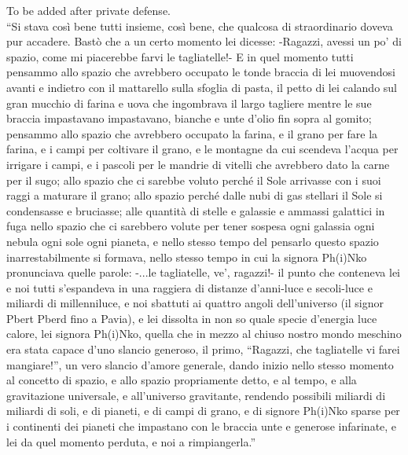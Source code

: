 
\begin{acknowledgements}
\addchaptertocentry{\acknowledgementname} %

To be added after private defense.\\

\textsf{``Si stava così bene tutti insieme, così bene, che qualcosa di straordinario doveva pur accadere.
Bastò che a un certo momento lei dicesse: -Ragazzi, avessi un po’ di spazio, come mi piacerebbe
farvi le tagliatelle!- E in quel momento tutti pensammo allo spazio che avrebbero occupato le
tonde braccia di lei muovendosi avanti e indietro con il mattarello sulla sfoglia di pasta, il petto
di lei calando sul gran mucchio di farina e uova che ingombrava il largo tagliere mentre le sue
braccia impastavano impastavano, bianche e unte d’olio fin sopra al gomito; pensammo allo
spazio che avrebbero occupato la farina, e il grano per fare la farina, e i campi per coltivare il
grano, e le montagne da cui scendeva l’acqua per irrigare i campi, e i pascoli per le mandrie di
vitelli che avrebbero dato la carne per il sugo; allo spazio che ci sarebbe voluto perché il Sole
arrivasse con i suoi raggi a maturare il grano; allo spazio perché dalle nubi di gas stellari il Sole si
condensasse e bruciasse; alle quantità di stelle e galassie e ammassi galattici in fuga nello spazio
che ci sarebbero volute per tener sospesa ogni galassia ogni nebula ogni sole ogni pianeta, e nello
stesso tempo del pensarlo questo spazio inarrestabilmente si formava, nello stesso tempo in cui la
signora Ph(i)Nko pronunciava quelle parole: -...le tagliatelle, ve’, ragazzi!- il punto che conteneva
lei e noi tutti s’espandeva in una raggiera di distanze d’anni-luce e secoli-luce e miliardi di millenniluce,
e noi sbattuti ai quattro angoli dell’universo (il signor Pbert Pberd fino a Pavia), e lei dissolta
in non so quale specie d’energia luce calore, lei signora Ph(i)Nko, quella che in mezzo al chiuso
nostro mondo meschino era stata capace d’uno slancio generoso, il primo, “Ragazzi, che tagliatelle
vi farei mangiare!”, un vero slancio d’amore generale, dando inizio nello stesso momento al
concetto di spazio, e allo spazio propriamente detto, e al tempo, e alla gravitazione universale, e
all’universo gravitante, rendendo possibili miliardi di miliardi di soli, e di pianeti, e di campi di
grano, e di signore Ph(i)Nko sparse per i continenti dei pianeti che impastano con le braccia unte
e generose infarinate, e lei da quel momento perduta, e noi a
rimpiangerla.''}


\end{acknowledgements}
